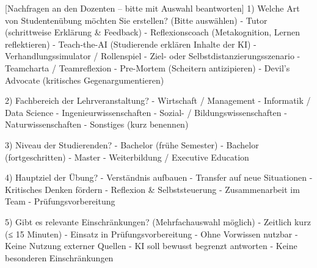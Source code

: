\documentclass[
  ngerman,
  letterpaper,
  DIV=11]{scrreprt}
\newenvironment{Shaded}{\begin{snugshade}}{\end{snugshade}}
\newcommand{\CommentTok}[1]{\textcolor[rgb]{0.37,0.37,0.37}{#1}}
\newcommand{\NormalTok}[1]{\textcolor[rgb]{0.00,0.23,0.31}{#1}}
\newcommand{\OtherTok}[1]{\textcolor[rgb]{0.00,0.23,0.31}{#1}}
\newcommand{\SpecialStringTok}[1]{\textcolor[rgb]{0.13,0.47,0.30}{#1}}
\begin{document}
\begin{tcolorbox}
\begin{Shaded}
\begin{Highlighting}[]
\CommentTok{[}\OtherTok{Nachfragen an den Dozenten – bitte mit Auswahl beantworten}\CommentTok{]}
\NormalTok{1) Welche Art von Studentenübung möchten Sie erstellen?}
\NormalTok{   (Bitte auswählen)}
\SpecialStringTok{   {-} }\NormalTok{Tutor (schrittweise Erklärung \& Feedback)}
\SpecialStringTok{   {-} }\NormalTok{Reflexionscoach (Metakognition, Lernen reflektieren)}
\SpecialStringTok{   {-} }\NormalTok{Teach{-}the{-}AI (Studierende erklären Inhalte der KI)}
\SpecialStringTok{   {-} }\NormalTok{Verhandlungssimulator / Rollenspiel}
\SpecialStringTok{   {-} }\NormalTok{Ziel{-} oder Selbstdistanzierungsszenario}
\SpecialStringTok{   {-} }\NormalTok{Teamcharta / Teamreflexion}
\SpecialStringTok{   {-} }\NormalTok{Pre{-}Mortem (Scheitern antizipieren)}
\SpecialStringTok{   {-} }\NormalTok{Devil’s Advocate (kritisches Gegenargumentieren)}

\NormalTok{2) Fachbereich der Lehrveranstaltung?}
\SpecialStringTok{   {-} }\NormalTok{Wirtschaft / Management}
\SpecialStringTok{   {-} }\NormalTok{Informatik / Data Science}
\SpecialStringTok{   {-} }\NormalTok{Ingenieurwissenschaften}
\SpecialStringTok{   {-} }\NormalTok{Sozial{-} / Bildungswissenschaften}
\SpecialStringTok{   {-} }\NormalTok{Naturwissenschaften}
\SpecialStringTok{   {-} }\NormalTok{Sonstiges (kurz benennen)}

\NormalTok{3) Niveau der Studierenden?}
\SpecialStringTok{   {-} }\NormalTok{Bachelor (frühe Semester)}
\SpecialStringTok{   {-} }\NormalTok{Bachelor (fortgeschritten)}
\SpecialStringTok{   {-} }\NormalTok{Master}
\SpecialStringTok{   {-} }\NormalTok{Weiterbildung / Executive Education}

\NormalTok{4) Hauptziel der Übung?}
\SpecialStringTok{   {-} }\NormalTok{Verständnis aufbauen}
\SpecialStringTok{   {-} }\NormalTok{Transfer auf neue Situationen}
\SpecialStringTok{   {-} }\NormalTok{Kritisches Denken fördern}
\SpecialStringTok{   {-} }\NormalTok{Reflexion \& Selbststeuerung}
\SpecialStringTok{   {-} }\NormalTok{Zusammenarbeit im Team}
\SpecialStringTok{   {-} }\NormalTok{Prüfungsvorbereitung}

\NormalTok{5) Gibt es relevante Einschränkungen?}
\NormalTok{   (Mehrfachauswahl möglich)}
\SpecialStringTok{   {-} }\NormalTok{Zeitlich kurz (≤ 15 Minuten)}
\SpecialStringTok{   {-} }\NormalTok{Einsatz in Prüfungsvorbereitung}
\SpecialStringTok{   {-} }\NormalTok{Ohne Vorwissen nutzbar}
\SpecialStringTok{   {-} }\NormalTok{Keine Nutzung externer Quellen}
\SpecialStringTok{   {-} }\NormalTok{KI soll bewusst begrenzt antworten}
\SpecialStringTok{   {-} }\NormalTok{Keine besonderen Einschränkungen}


\end{Highlighting}
\end{Shaded}
\end{tcolorbox}
\end{document}

